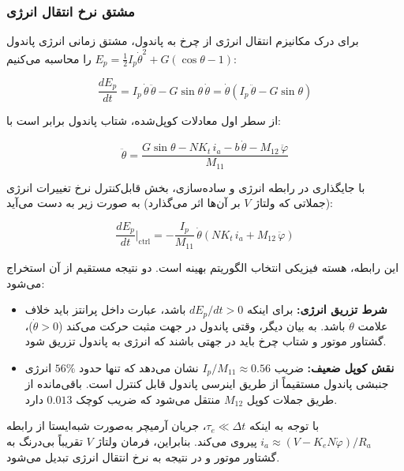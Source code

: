 \subsubsection{مشتق نرخ انتقال انرژی}

برای درک مکانیزم انتقال انرژی از چرخ به پاندول، مشتق زمانی انرژی پاندول $E_p = \tfrac{1}{2}I_p\dot\theta^2 + G(\cos\theta - 1)$ را محاسبه می‌کنیم:

\begin{equation}
    \frac{dE_p}{dt} = I_p\,\dot\theta\,\ddot\theta - G\sin\theta\,\dot\theta
    = \dot\theta\!\left(I_p\,\ddot\theta - G\sin\theta\right)
\end{equation}

از سطر اول معادلات کوپل‌شده، شتاب پاندول برابر است با:

\begin{equation}
    \ddot\theta = \frac{G\sin\theta - NK_t\, i_a - b\,\dot\theta - M_{12}\,\ddot\varphi}{M_{11}}
\end{equation}

با جایگذاری در رابطه انرژی و ساده‌سازی، بخش قابل‌کنترل نرخ تغییرات انرژی (جملاتی که ولتاژ $V$ بر آن‌ها اثر می‌گذارد) به صورت زیر به دست می‌آید:

\begin{equation}
    \boxed{\frac{dE_p}{dt}\bigg|_{\text{ctrl}}
    = -\frac{I_p}{M_{11}}\,\dot\theta\!\left(NK_t\, i_a + M_{12}\,\ddot\varphi\right)}
\end{equation}

این رابطه، هسته فیزیکی انتخاب الگوریتم بهینه است. دو نتیجه مستقیم از آن استخراج می‌شود:

\begin{itemize}
    \item \textbf{شرط تزریق انرژی:} برای اینکه $dE_p/dt > 0$ باشد، عبارت داخل پرانتز باید خلاف علامت $\dot\theta$ باشد. به بیان دیگر، وقتی پاندول در جهت مثبت حرکت می‌کند ($\dot\theta > 0$)، گشتاور موتور و شتاب چرخ باید در جهتی باشند که انرژی به پاندول تزریق شود.
    \item \textbf{نقش کوپل ضعیف:} ضریب $I_p/M_{11} \approx 0.56$ نشان می‌دهد که تنها حدود $56\%$ انرژی جنبشی پاندول مستقیماً از طریق اینرسی پاندول قابل کنترل است. باقی‌مانده از طریق جملات کوپل $M_{12}$ منتقل می‌شود که ضریب کوچک $0.013$ دارد.
\end{itemize}

با توجه به اینکه $\tau_e \ll \Delta t$، جریان آرمیچر به‌صورت شبه‌ایستا از رابطه $i_a \approx (V - K_e N\dot\varphi)/R_a$ پیروی می‌کند. بنابراین، فرمان ولتاژ $V$ تقریباً بی‌درنگ به گشتاور موتور و در نتیجه به نرخ انتقال انرژی تبدیل می‌شود.

